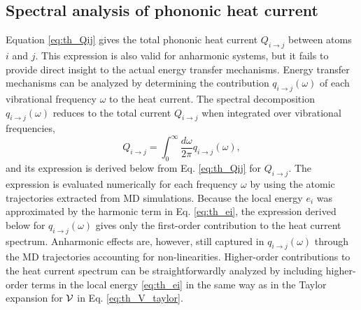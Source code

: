 \subsection{Spectral analysis of phononic heat current}
\label{sec:th_spectral_curr}
Equation \eqref{eq:th_Qij} gives the total phononic heat current $Q_{i\to j}$ between atoms $i$ and $j$. This expression is also valid for anharmonic systems, but it fails to provide direct insight to the actual energy transfer mechanisms. Energy transfer mechanisms can be analyzed by determining the contribution $q_{i\to j}(\omega)$ of each vibrational frequency $\omega$ to the heat current. The spectral decomposition $q_{i\to j}(\omega)$ reduces to the total current $Q_{i\to j}$ when integrated over vibrational frequencies,
\begin{equation}
 Q_{i\to j} = \int_0^{\infty} \frac{d\omega}{2\pi} q_{i\to j}(\omega), \label{eq:th_qij_def}
\end{equation}
and its expression is derived below from Eq. \eqref{eq:th_Qij} for $Q_{i\to j}$. The expression is evaluated numerically for each frequency $\omega$ by using the atomic trajectories extracted from MD simulations. Because the local energy $e_i$ was approximated by the harmonic term in Eq. \eqref{eq:th_ei}, the expression derived below for $q_{i\to j}(\omega)$ gives only the first-order contribution to the heat current spectrum. Anharmonic effects are, however, still captured in $q_{i\to j}(\omega)$ through the MD trajectories accounting for non-linearities. Higher-order contributions to the heat current spectrum can be straightforwardly analyzed by including higher-order terms in the local energy \eqref{eq:th_ei} in the same way as in the Taylor expansion for $\mathcal{V}$ in Eq. \eqref{eq:th_V_taylor}. 


